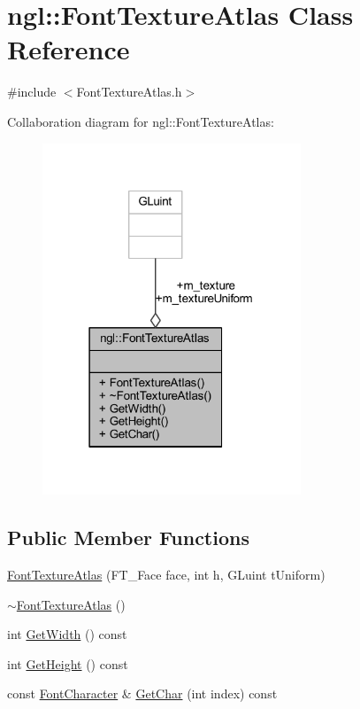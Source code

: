 \hypertarget{classngl_1_1_font_texture_atlas}{}\section{ngl\+:\+:Font\+Texture\+Atlas Class Reference}
\label{classngl_1_1_font_texture_atlas}


{\ttfamily \#include $<$Font\+Texture\+Atlas.\+h$>$}



Collaboration diagram for ngl\+:\+:Font\+Texture\+Atlas\+:
\nopagebreak
\begin{figure}[H]
\begin{center}
\leavevmode
\includegraphics[width=219pt]{classngl_1_1_font_texture_atlas__coll__graph}
\end{center}
\end{figure}
\subsection*{Public Member Functions}
\begin{DoxyCompactItemize}
\item 
\mbox{\hyperlink{classngl_1_1_font_texture_atlas_a4021a39dbb1ed9c2c7363d58ef1f1100}{Font\+Texture\+Atlas}} (F\+T\+\_\+\+Face face, int h, G\+Luint t\+Uniform)
\item 
\mbox{\hyperlink{classngl_1_1_font_texture_atlas_a11bdab6a6379dc3ffc3c1c70d7d60f6a}{$\sim$\+Font\+Texture\+Atlas}} ()
\item 
int \mbox{\hyperlink{classngl_1_1_font_texture_atlas_a5c02f80c05ab015cb45f7a6a785e39bf}{Get\+Width}} () const
\item 
int \mbox{\hyperlink{classngl_1_1_font_texture_atlas_a8983a8edc4826c0ce361600d9b049a86}{Get\+Height}} () const
\item 
const \mbox{\hyperlink{structngl_1_1_font_character}{Font\+Character}} \& \mbox{\hyperlink{classngl_1_1_font_texture_atlas_a2611b13eff0c0b12b7895ea806bb53f8}{Get\+Char}} (int index) const
\end{DoxyCompactItemize}
